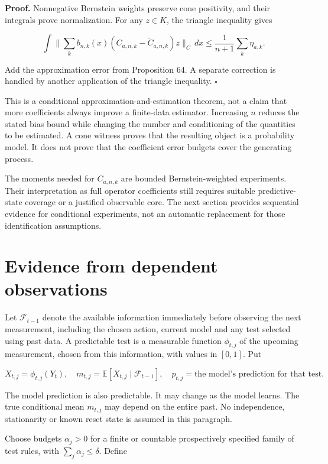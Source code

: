 \textbf{Proof.} Nonnegative Bernstein weights preserve cone positivity,
and their integrals prove normalization. For any \(z\in K\), the
triangle inequality gives

\[
\int\|\textstyle\sum_k b_{n,k}(x)(C_{a,n,k}-\widetilde C_{a,n,k})z\|_C\,dx
\leq\frac1{n+1}\sum_k\eta_{a,k}.
\]

Add the approximation error from Proposition 64. A separate correction
is handled by another application of the triangle inequality.
\(\square\)

This is a conditional approximation-and-estimation theorem, not a claim
that more coefficients always improve a finite-data estimator.
Increasing \(n\) reduces the stated bias bound while changing the number
and conditioning of the quantities to be estimated. A cone witness
proves that the resulting object is a probability model. It does not
prove that the coefficient error budgets cover the generating process.

The moments needed for \(C_{a,n,k}\) are bounded Bernstein-weighted
experiments. Their interpretation as full operator coefficients still
requires suitable predictive-state coverage or a justified observable
core. The next section provides sequential evidence for conditional
experiments, not an automatic replacement for those identification
assumptions.

\section{Evidence from dependent observations}\label{LSM:evidence-from-dependent-observations}

Let \(\mathcal F_{t-1}\) denote the available information immediately
before observing the next measurement, including the chosen action,
current model and any test selected using past data. A predictable test
is a measurable function \(\phi_{t,j}\) of the upcoming measurement,
chosen from this information, with values in \([0,1]\). Put

\[
X_{t,j}=\phi_{t,j}(Y_t),\quad
m_{t,j}=\mathbb E[X_{t,j}\mid\mathcal F_{t-1}],\quad
p_{t,j}=\text{the model's prediction for that test}.
\]

The model prediction is also predictable. It may change as the model
learns. The true conditional mean \(m_{t,j}\) may depend on the entire
past. No independence, stationarity or known reset state is assumed in
this paragraph.

Choose budgets \(\alpha_j>0\) for a finite or countable prospectively
specified family of test rules, with \(\sum_j\alpha_j\leq\delta\).
Define

